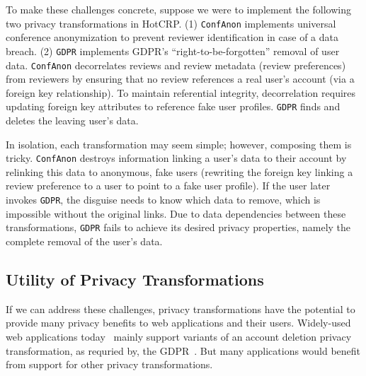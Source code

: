 %
To make these challenges concrete, suppose we were to implement the following two privacy
transformations in HotCRP.
%
(1) \texttt{ConfAnon} implements universal conference anonymization to
prevent reviewer identification in case of a data breach.
%
(2) \texttt{GDPR} implements GDPR's ``right-to-be-forgotten'' removal of user data.
%
\texttt{ConfAnon} decorrelates reviews and review metadata (\eg review preferences) from reviewers
by ensuring that no review references a real user's account (via a foreign key relationship).
To maintain referential integrity, decorrelation requires updating foreign key
attributes to reference fake user profiles.
\texttt{GDPR} finds and deletes the leaving user's data.
%

%
In isolation, each transformation may seem simple; however, composing them is tricky.
\texttt{ConfAnon} destroys information linking a user's data to their account by relinking this data
to anonymous, fake users (\eg rewriting the foreign key linking a review preference to a user to
point to a fake user profile).  If the user later invokes \texttt{GDPR}, the
disguise needs to know which data to remove, which is impossible without the original links.
%
Due to data dependencies between these transformations, \texttt{GDPR} fails to achieve its desired
privacy properties, namely the complete removal of the user's data.
%

\subsection{Utility of Privacy Transformations}
If we can address these challenges, privacy transformations have the potential to provide many
privacy benefits to web applications and their users.
Widely-used web applications today~\cite{spotify:privacy, amazon:privacy,
strava:privacy, hotcrp:privacy, wikipedia:privacy, facebook:privacy, twitter:privacy,
reddit:privacy, github:privacy, lobsters:privacy} mainly support variants of an account
deletion privacy transformation, as requried by, \eg the GDPR~\cite[Art.\ 17]{eu:gdpr}.
%
But many applications would benefit from support for other privacy transformations.


